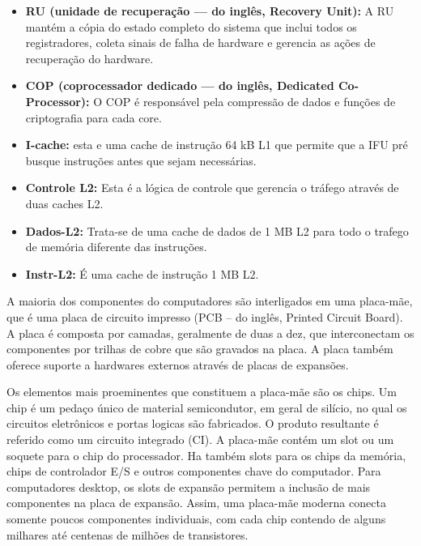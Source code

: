 \documentclass{article}
\begin{document}
\begin{itemize}
    \item \textbf{RU (unidade de recuperação — do inglês, Recovery Unit):} A RU
        mantém a cópia do estado completo do sistema que inclui todos os
        registradores, coleta sinais de falha de hardware e gerencia as ações de
        recuperação do hardware.

    \item \textbf{COP (coprocessador dedicado — do inglês, Dedicated
        Co-Processor):} O COP é responsável pela compressão de dados e funções
        de criptografia para cada core.

    \item \textbf{I-cache:} esta e uma cache de instrução 64 kB L1 que permite
        que a IFU pré busque instruções antes que sejam necessárias.

    \item \textbf{Controle L2:} Esta é a lógica de controle que gerencia o
        tráfego através de duas caches L2.

    \item \textbf{Dados-L2:} Trata-se de uma cache de dados de 1 MB L2 para todo o
        trafego de memória diferente das instruções.

    \item \textbf{Instr-L2:} É uma cache de instrução 1 MB L2.
\end{itemize}

A maioria dos componentes do computadores são interligados em uma placa-mãe, que
é uma placa de circuito impresso (PCB -- do inglês, Printed Circuit Board). A
placa é composta por camadas, geralmente de duas a dez, que interconectam os
componentes por trilhas de cobre que são gravados na placa. A placa também
oferece suporte a hardwares externos através de placas de expansões.

Os elementos mais proeminentes que constituem a placa-mãe são os chips. Um chip é um pedaço
único de material semicondutor, em geral de silício, no qual os circuitos
eletrônicos e portas logicas são fabricados. O produto resultante é referido
como um circuito integrado (CI). A placa-mãe contém um slot ou um soquete para o chip
do processador. Ha também slots para os chips da memória,
chips de controlador E/S e outros componentes chave do computador. Para
computadores desktop, os slots de expansão permitem a inclusão de mais
componentes na placa de expansão. Assim, uma placa-mãe moderna conecta somente
poucos componentes individuais, com cada chip contendo de alguns milhares até
centenas de milhões de transistores.
\end{document}

